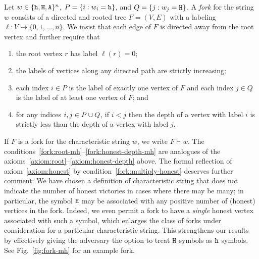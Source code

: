 
\begin{definition}[Fork]\label{def:fork}
  Let $w\in \{\mathtt{h}, \mathtt{H}, \mathtt{A}\}^n$, $P = \{ i : w_i = \mathtt{h}\}$, and $Q = \{ j : w_j = \mathtt{H}\}$. 
  A \emph{fork} for the string $w$ consists of a directed and rooted
  tree $F=(V,E)$ with a labeling $\ell:V\to\{0,1,\dots,n\}$. We insist
  that each edge of $F$ is directed away from the root vertex and
  further require that
  \begin{enumerate}[label=(F{\arabic*})]
    \item\label{fork:root-mh} the root vertex $r$ has label $\ell(r)=0$;

    \item\label{fork:monotone-mh} the labels of vertices along any directed path are strictly increasing;

    \item\label{fork:unique-honest-mh}\label{fork:multiply-honest}
    each index $i\in P$ 
    is the label of exactly one vertex of $F$ 
    and 
    each index $j\in Q$ 
    is the label of at least one vertex of $F$; and 

    \item\label{fork:honest-depth-mh} 
    for any indices $i,j\in P \cup Q$, 
    if $i<j$ then 
    the depth of a vertex with label $i$ 
    is strictly less than 
    the depth of a vertex with label $j$.
  \end{enumerate}
\end{definition}

If $F$ is a fork for the characteristic string $w$, we write
$F\vdash w$.  The conditions~\ref{fork:root-mh}--\ref{fork:honest-depth-mh}
are analogues of the axioms~\ref{axiom:root}--\ref{axiom:honest-depth}
above. The formal reflection of axiom~\ref{axiom:honest} by
condition~\ref{fork:multiply-honest} deserves further comment: We have
chosen a definition of characteristic string that does not indicate
the number of honest victories in cases where there may be many; in
particular, the symbol $\mathtt{H}$ may be associated with any positive number
of (honest) vertices in the fork. Indeed, we even permit a fork to
have a \emph{single} honest vertex associated with such a symbol,
which enlarges the class of forks under consideration for a particular
characteristic string. This strengthens our results by effectively
giving the adversary the option to treat $\mathtt{H}$ symbols as $\mathtt{h}$
symbols. See Fig.~\ref{fig:fork-mh}
for an example fork. 

